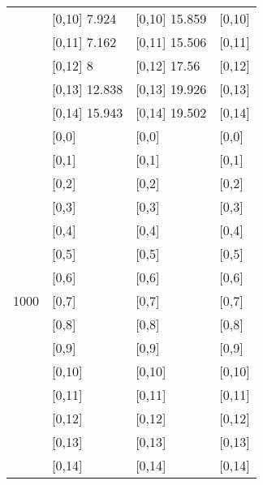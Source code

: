 \begin{table}
\begin{tabular}[t]{llll}
\addlinespace
 & {}[0,10] 7.924 & {}[0,10] 15.859 & {}[0,10]\\
 & {}[0,11] 7.162 & {}[0,11] 15.506 & {}[0,11]\\
 & {}[0,12] 8 & {}[0,12] 17.56 & {}[0,12]\\
 & {}[0,13] 12.838 & {}[0,13] 19.926 & {}[0,13]\\
 & {}[0,14] 15.943 & {}[0,14] 19.502 & {}[0,14]\\
\addlinespace
 & {}[0,0] & {}[0,0] & {}[0,0]\\
 & {}[0,1] & {}[0,1] & {}[0,1]\\
 & {}[0,2] & {}[0,2] & {}[0,2]\\
 & {}[0,3] & {}[0,3] & {}[0,3]\\
 & {}[0,4] & {}[0,4] & {}[0,4]\\
\addlinespace
 & {}[0,5] & {}[0,5] & {}[0,5]\\
 & {}[0,6] & {}[0,6] & {}[0,6]\\
1000 & {}[0,7] & {}[0,7] & {}[0,7]\\
 & {}[0,8] & {}[0,8] & {}[0,8]\\
 & {}[0,9] & {}[0,9] & {}[0,9]\\
\addlinespace
 & {}[0,10] & {}[0,10] & {}[0,10]\\
 & {}[0,11] & {}[0,11] & {}[0,11]\\
 & {}[0,12] & {}[0,12] & {}[0,12]\\
 & {}[0,13] & {}[0,13] & {}[0,13]\\
 & {}[0,14] & {}[0,14] & {}[0,14]\\
\bottomrule
\end{tabular}
\end{table}

